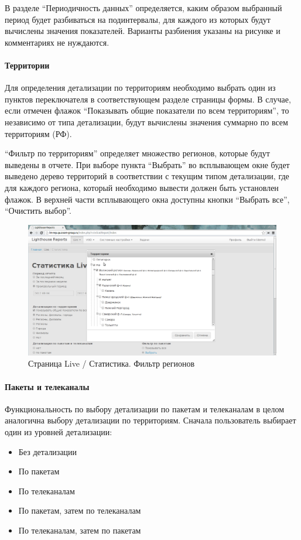 В разделе ``Периодичность данных'' определяется, каким образом выбранный период будет разбиваться на подинтервалы,
для каждого из которых будут вычислены значения показателей.
Варианты разбиения указаны на рисунке и комментариях не нуждаются.

\paragraph{Территории}
Для определения детализации по территориям необходимо выбрать один из пунктов
переключателя в соответствующем разделе страницы формы.
В случае, если отмечен флажок ``Показывать общие показатели по всем территориям'',
то независимо от типа детализации, будут вычислены значения суммарно по всем
территориям (РФ). 

``Фильтр по территориям'' определяет множество регионов, которые будут 
выведены в отчете. При выборе пункта ``Выбрать'' во всплывающем окне будет выведено дерево
территорий в соответствии с текущим типом детализации, где для каждого 
региона, который необходимо вывести должен быть установлен флажок.
В верхней части всплывающего окна доступны кнопки ``Выбрать все'', ``Очистить выбор''.

\begin{figure}[!ht]
\begin{center}
\hspace*{-1cm} \includegraphics[scale=0.35, trim=0mm 0mm 100mm 10mm, clip]{../resources/screens/live_stat_regions.png}
\caption{Страница Live / Статистика. Фильтр регионов}
\end{center}
\end{figure}

\paragraph{Пакеты и телеканалы}
Функциональность по выбору детализации по пакетам и телеканалам в целом аналогична 
выбору детализации по территориям. Сначала пользователь выбирает один из уровней детализации:
\begin{itemize}
\item{
  Без детализации
}
\item{
  По пакетам
}
\item{
  По телеканалам
}
\item{
  По пакетам, затем по телеканалам
}
\item{
  По телеканалам, затем по пакетам
}
\end{itemize}

